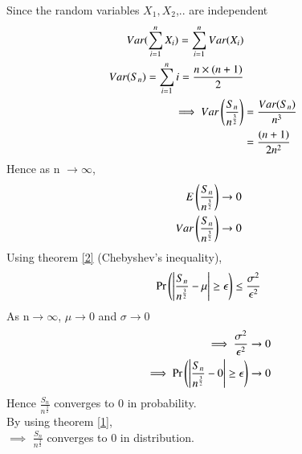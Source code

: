 \documentclass[journal,12pt,twocolumn]{IEEEtran}
\begin{document}
Since the random variables $X_{1},X_{2}$,.. are independent \begin{align} 
Var(\sum_{i=1}^{n}X_{i})=\sum_{i=1}^{n}Var(X_{i})\\
Var(S_{n})=\sum_{i=1}^{n}i=\frac{n \times (n+1)}{2}\\
\implies Var\left(\frac{S_{n}}{n^{\frac{3}{2}}}\right)&=\frac{Var(S_{n})}{n^{3}}\\
&=\frac{(n+1)}{2n^{2}}
\end{align} 
Hence as n $\to \infty$,
\begin{align}
    E\left(\frac{S_{n}}{n^{\frac{3}{2}}}\right) \to 0\\
    Var\left(\frac{S_{n}}{n^{\frac{3}{2}}}\right) \to 0\\
\end{align}
Using theorem \ref{2} (Chebyshev's inequality),
\begin{align}
    \Pr\left(\left\vert\frac{S_{n}}{n^{\frac{3}{2}}}-\mu\right\vert\geq \epsilon\right) \leq \frac{\sigma^{2}}{\epsilon^{2}}
\end{align}
As n$\to \infty$, $\mu \to 0$ and $\sigma \to 0$
\begin{align}
    \implies \frac{\sigma^{2}}{\epsilon^{2}} \to 0\\
    \implies  \Pr\left(\left\vert\frac{S_{n}}{n^{\frac{3}{2}}}-0\right\vert\geq \epsilon\right) \to 0
\end{align}
Hence $\frac{S_{n}}{n^{\frac{3}{2}}}$ converges to 0 in probability.\\
By using theorem \ref{1},\\
$\implies$ $\frac{S_{n}}{n^{\frac{3}{2}}}$ converges to 0 in distribution.
\end{document}
